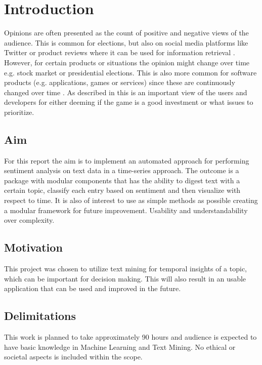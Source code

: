 \chapter{Introduction}
\label{cha:introduction}


Opinions are often presented as the count of positive and negative views of the audience. This is common for elections, 
but also on social media platforms like Twitter or product reviews where it can be used for information retrieval \cite{twitter_mining}. 
However, for certain products or situations the opinion might change over time e.g. stock market or presidential elections. 
This is also more common for software products (e.g. applications, games or services) since these are continuously changed over time \cite{steam_reviews}.
As described in \cite{steam_reviews} this is an important view of the users and developers for either deeming if the game is a good investment or what 
issues to prioritize.




\section{Aim}
\label{sec:aim}

For this report the aim is to implement an automated approach for performing sentiment analysis on text data in a time-series approach. 
The outcome is a package with modular components that has the ability to digest text with a certain topic, classify each entry based on sentiment and then visualize with respect to time.
It is also of interest to use as simple methods as possible creating a modular framework for future improvement. 
Usability and understandability over complexity.


\section{Motivation}
\label{sec:motivation}

This project was chosen to utilize text mining for temporal insights of a topic, which can be important for decision making. This will also result in an usable application 
that can be used and improved in the future. 


\section{Delimitations}
\label{sec:delimitations}


This work is planned to take approximately 90 hours and audience is expected to have basic knowledge in Machine Learning and Text Mining. 
No ethical or societal aspects is included within the scope.